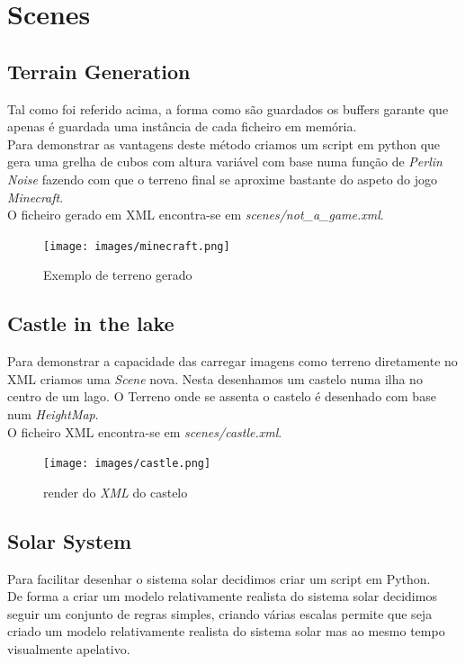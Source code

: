 \documentclass[a4paper]{report}
\begin{document}
\chapter{Scenes}
\section{Terrain Generation}
Tal como foi referido acima, a forma como são guardados os buffers garante que
apenas é guardada uma instância de cada ficheiro em memória. \\
Para demonstrar as vantagens deste método criamos um script em python que gera
uma grelha de cubos com altura variável com base numa função de \textit{Perlin
Noise} fazendo com que o terreno final se aproxime bastante do aspeto do jogo
\textit{Minecraft}.\\
O ficheiro gerado em XML encontra-se em \textit{scenes/not\_a\_game.xml}.

\begin{figure}[H]
    \centering 
    \texttt{[image: images/minecraft.png]}  
    \caption{Exemplo de terreno gerado}
\end{figure}

\section{Castle in the lake}
Para demonstrar a capacidade das carregar imagens como terreno diretamente no
XML criamos uma \textit{Scene} nova. Nesta desenhamos um castelo numa ilha no
centro de um lago. O Terreno onde se assenta o castelo é desenhado com base num
\textit{HeightMap}.\\
O ficheiro XML encontra-se em \textit{scenes/castle.xml}.

\begin{figure}[H]
    \centering 
    \texttt{[image: images/castle.png]}  
    \caption{render do \textit{XML} do castelo}
\end{figure}

\section{Solar System}
Para facilitar desenhar o sistema solar decidimos criar um script em Python.\\
De forma a criar um modelo relativamente realista do sistema solar decidimos
seguir um conjunto de regras simples, criando várias escalas permite que seja
criado um modelo relativamente realista do sistema solar mas ao mesmo tempo
visualmente apelativo.\\
\end{document}
